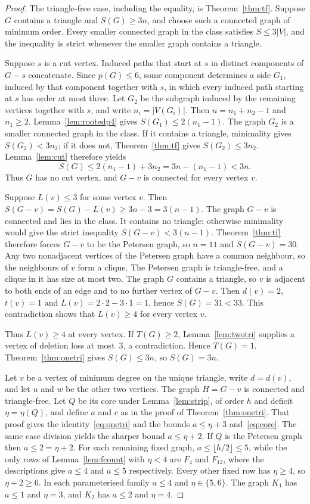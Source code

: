 \documentclass[ASNA]{USG}
\theoremstyle{WBstyletwo}
\numberwithin{equation}{section}
\newcommand{\pp}{p}
\begin{document}
\begin{proof}
The triangle-free case, including the equality, is Theorem~\ref{thm:tf}. Suppose $G$ contains a triangle and $S(G)\ge 3n$, and choose such a connected graph of minimum order. Every smaller connected graph in the class satisfies $S\le 3|V|$, and the inequality is strict whenever the smaller graph contains a triangle.

Suppose $s$ is a cut vertex. Induced paths that start at $s$ in distinct components of $G-s$ concatenate. Since $\pp(G)\le 6$, some component determines a side $G_1$, induced by that component together with $s$, in which every induced path starting at $s$ has order at most three. Let $G_2$ be the subgraph induced by the remaining vertices together with $s$, and write $n_i=|V(G_i)|$. Then $n=n_1+n_2-1$ and $n_1\ge 2$. Lemma~\ref{lem:rootedp4} gives $S(G_1)\le 2(n_1-1)$. The graph $G_2$ is a smaller connected graph in the class. If it contains a triangle, minimality gives $S(G_2)<3n_2$; if it does not, Theorem~\ref{thm:tf} gives $S(G_2)\le 3n_2$. Lemma~\ref{lem:cut} therefore yields
\[
S(G)\le 2(n_1-1)+3n_2=3n-(n_1-1)<3n.
\]
Thus $G$ has no cut vertex, and $G-v$ is connected for every vertex $v$.

Suppose $L(v)\le 3$ for some vertex $v$. Then $S(G-v)=S(G)-L(v)\ge 3n-3=3(n-1)$. The graph $G-v$ is connected and lies in the class. It contains no triangle: otherwise minimality would give the strict inequality $S(G-v)<3(n-1)$. Theorem~\ref{thm:tf} therefore forces $G-v$ to be the Petersen graph, so $n=11$ and $S(G-v)=30$. Any two nonadjacent vertices of the Petersen graph have a common neighbour, so the neighbours of $v$ form a clique. The Petersen graph is triangle-free, and a clique in it has size at most two. The graph $G$ contains a triangle, so $v$ is adjacent to both ends of an edge and to no further vertex of $G-v$. Then $d(v)=2$, $t(v)=1$ and $L(v)=2\cdot 2-3\cdot 1=1$, hence $S(G)=31<33$. This contradiction shows that $L(v)\ge 4$ for every vertex $v$.

Thus $L(v)\ge 4$ at every vertex. If $T(G)\ge 2$, Lemma~\ref{lem:twotri} supplies a vertex of deletion loss at most~$3$, a contradiction. Hence $T(G)=1$. Theorem~\ref{thm:onetri} gives $S(G)\le 3n$, so $S(G)=3n$.

Let $v$ be a vertex of minimum degree on the unique triangle, write $d=d(v)$, and let $u$ and $w$ be the other two vertices. The graph $H=G-v$ is connected and triangle-free. Let $Q$ be its core under Lemma~\ref{lem:strip}, of order $h$ and deficit $\eta=\eta(Q)$, and define $a$ and $c$ as in the proof of Theorem~\ref{thm:onetri}. That proof gives the identity~\eqref{eq:onetri} and the bounds $a\le\eta+3$ and~\eqref{eq:core}. The same case division yields the sharper bound $a\le\eta+2$. If $Q$ is the Petersen graph then $a\le 2=\eta+2$. For each remaining fixed graph, $a\le\lfloor h/2\rfloor\le 5$, while the only rows of Lemma~\ref{lem:fcount} with $\eta<4$ are $F_4$ and $F_{12}$, where the descriptions give $a\le 4$ and $a\le 5$ respectively. Every other fixed row has $\eta\ge 4$, so $\eta+2\ge 6$. In each parameterised family $a\le 4$ and $\eta\in\{5,6\}$. The graph $K_1$ has $a\le 1$ and $\eta=3$, and $K_2$ has $a\le 2$ and $\eta=4$.


\end{proof}
\end{document}
